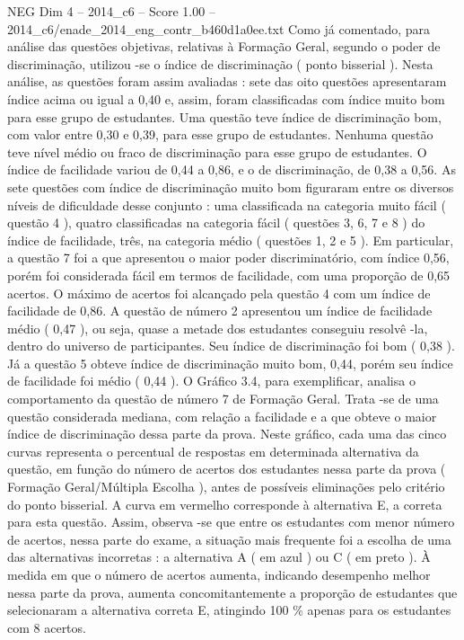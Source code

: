 \begin{textsample}{NEG Dim 4 – 2014\_c6 – Score 1.00 – 2014\_c6/enade\_2014\_eng\_contr\_b460d1a0ee.txt}
Como já comentado, para análise das questões objetivas, relativas à Formação Geral, segundo o poder de discriminação, utilizou -se o índice de discriminação ( ponto bisserial ).
Nesta análise, as questões foram assim avaliadas : sete das oito questões apresentaram índice acima ou igual a 0,40 e, assim, foram classificadas com índice muito bom para esse grupo de estudantes.
Uma questão teve índice de discriminação bom, com valor entre 0,30 e 0,39, para esse grupo de estudantes.
Nenhuma questão teve nível médio ou fraco de discriminação para esse grupo de estudantes.
O índice de facilidade variou de 0,44 a 0,86, e o de discriminação, de 0,38 a 0,56.
As sete questões com índice de discriminação muito bom figuraram entre os diversos níveis de dificuldade desse conjunto : uma classificada na categoria muito fácil ( questão 4 ), quatro classificadas na categoria fácil ( questões 3, 6, 7 e 8 ) do índice de facilidade, três, na categoria médio ( questões 1, 2 e 5 ).
Em particular, a questão 7 foi a que apresentou o maior poder discriminatório, com índice 0,56, porém foi considerada fácil em termos de facilidade, com uma proporção de 0,65 acertos.
O máximo de acertos foi alcançado pela questão 4 com um índice de facilidade de 0,86.
A questão de número 2 apresentou um índice de facilidade médio ( 0,47 ), ou seja, quase a metade dos estudantes conseguiu resolvê -la, dentro do universo de participantes.
Seu índice de discriminação foi bom ( 0,38 ).
Já a questão 5 obteve índice de discriminação muito bom, 0,44, porém seu índice de facilidade foi médio ( 0,44 ).
O Gráfico 3.4, para exemplificar, analisa o comportamento da questão de número 7 de Formação Geral.
Trata -se de uma questão considerada mediana, com relação a facilidade e a que obteve o maior índice de discriminação dessa parte da prova.
Neste gráfico, cada uma das cinco curvas representa o percentual de respostas em determinada alternativa da questão, em função do número de acertos dos estudantes nessa parte da prova ( Formação Geral/Múltipla Escolha ), antes de possíveis eliminações pelo critério do ponto bisserial.
A curva em vermelho corresponde à alternativa E, a correta para esta questão.
Assim, observa -se que entre os estudantes com menor número de acertos, nessa parte do exame, a situação mais frequente foi a escolha de uma das alternativas incorretas : a alternativa A ( em azul ) ou C ( em preto ).
À medida em que o número de acertos aumenta, indicando desempenho melhor nessa parte da prova, aumenta concomitantemente a proporção de estudantes que selecionaram a alternativa correta E, atingindo 100 \% apenas para os estudantes com 8 acertos.

\end{textsample}
